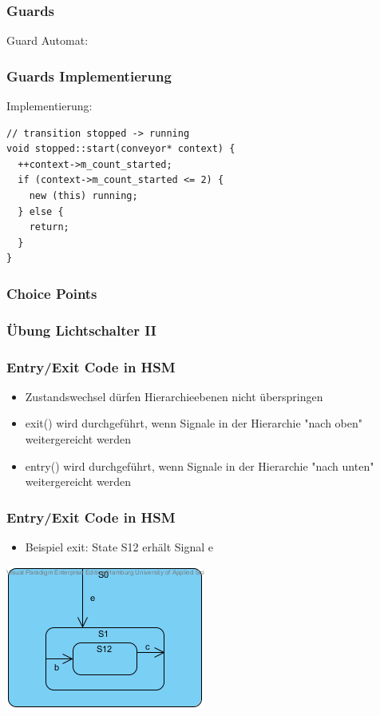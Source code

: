 \documentclass{beamer}
\begin{document}
\begin{frame}
 \frametitle{Guards}
 Guard Automat:
\end{frame}

\begin{frame}[fragile]
 \frametitle{Guards Implementierung}
 Implementierung:
  \begin{lstlisting}
// transition stopped -> running
void stopped::start(conveyor* context) {
  ++context->m_count_started;
  if (context->m_count_started <= 2) {
    new (this) running;
  } else {
    return;
  }
}
  \end{lstlisting}
\end{frame}

\begin{frame}
 \frametitle{Choice Points}
\end{frame}

\begin{frame}
 \frametitle{\"Ubung Lichtschalter II}
\end{frame}

\begin{frame}
	\frametitle{Entry/Exit Code in HSM }
	\begin{itemize}
		\item Zustandswechsel d\"urfen Hierarchieebenen nicht \"uberspringen
		\item exit() wird durchgef\"uhrt, wenn Signale in der Hierarchie "nach oben" weitergereicht werden 
		\item entry() wird  durchgef\"uhrt, wenn Signale in der Hierarchie "nach unten" weitergereicht werden
	\end{itemize}
\end{frame}

\begin{frame}
	\frametitle{Entry/Exit Code in HSM }
	\begin{itemize}
		\item Beispiel exit: State S12 erh\"alt Signal e
	\end{itemize}
	\includegraphics[scale=.6]{img/beispiel_exitSM}
\end{frame}
\end{document}
